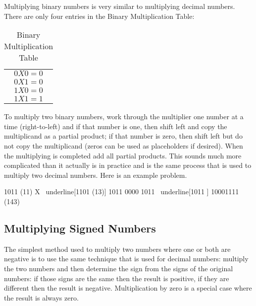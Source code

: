 Multiplying binary numbers is very similar to multiplying decimal numbers. There are only four entries in the Binary Multiplication Table:

\begin{table}[H]
  \sffamily
  \newcommand{\head}[1]{\textcolor{white}{\textbf{#1}}}    
  \begin{center}
    \begin{tabular}{ c } 
      $ 0X0=0 $   \\
      $ 0X1=0 $   \\
      $ 1X0=0 $   \\
      $ 1X1=1 $
    \end{tabular}
  \end{center}
  \caption{Binary Multiplication Table}
  \label{MO:tab:binary_multiplication}
\end{table} 

To multiply two binary numbers, work through the multiplier one number at a time (right-to-left) and if that number is one, then shift left and copy the multiplicand as a partial product; if that number is zero, then shift left but do not copy the multiplicand (zeros can be used as placeholders if desired). When the multiplying is completed add all partial products. This sounds much more complicated than it actually is in practice and is the same process that is used to multiply two decimal numbers. Here is an example problem.

\begin{binDisp}[commandchars=~\[\]]
        1011  (11)
      X ~underline[1101  (13)]
        1011
       0000
      1011
     ~underline[1011          ]
    10001111  (143)
\end{binDisp}

\subsection{Multiplying Signed Numbers}
\label{MO:sub:multiplying_signed_numbers}

The simplest method used to multiply two numbers where one or both are negative is to use the same technique that is used for decimal numbers: multiply the two numbers and then determine the sign from the signs of the original numbers: if those signs are the same then the result is positive, if they are different then the result is negative. Multiplication by zero is a special case where the result is always zero.

